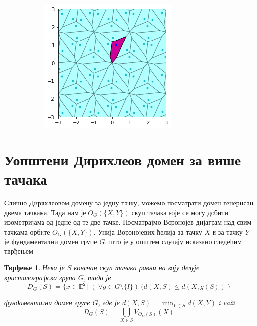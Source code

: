 \documentclass[12pt]{report}
\newtheorem{tvrdjenje}{\bf Тврђење}
\begin{document}
\begin{figure}[H]
\begin{subfigure}[b]{0.3\textwidth}
    \label{fig:f2}
  \end{subfigure}
  \begin{subfigure}[b]{0.3\textwidth}
    \includegraphics[width=\textwidth]{output_12_0.png}
    \label{fig:f3}
  \end{subfigure}
\end{figure}


    \section{Уопштени Дирихлеов домен за више тачака}\label{konstrukcija-dirihleove-fundamentalne-oblasti}
    
Слично Дирихлеовом домену за једну тачку,  можемо посматрати домен генерисан двема тачкама. Тада нам је  $O_G(\{X,Y\})$ скуп тачака које се могу добити изометријама од једне од те две тачке. Посматрајмо Воронојев дијаграм над свим тачкама орбите $O_G(\{X,Y\})$.  Унија Воронојевих ћелија за тачку $X$ и за тачку $Y$ је фундаментални домен групе $G$, што је у општем случају исказано следећим тврђењем
\begin{tvrdjenje}
Нека је $S$ коначан скуп тачака равни на коју делује кристалографска група $G$, тада је 
$$D_G(S) = \{x \in \mathbb{E}^2\:|\:(\:\forall g \in G \setminus \{I\})\:(d(X,S)\leq d(X,g(S))\:\}$$

фундаментални домен групе $G$, где је $d(X,S) = \min_{Y \in S} d(X,Y)$ i va\v zi 
$$D_G(S) = \bigcup_{X \in S} V_{O_G(S)}(X) $$ 
\end{tvrdjenje}
\end{document}
